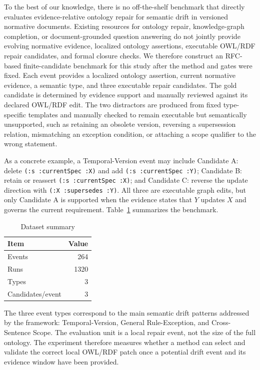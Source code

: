 \documentclass[conference]{IEEEtran}
\begin{document}
To the best of our knowledge, there is no off-the-shelf benchmark that directly evaluates evidence-relative ontology repair for semantic drift in versioned normative documents. Existing resources for ontology repair, knowledge-graph completion, or document-grounded question answering do not jointly provide evolving normative evidence, localized ontology assertions, executable OWL/RDF repair candidates, and formal closure checks. We therefore construct an RFC-based finite-candidate benchmark for this study after the method and gates were fixed. Each event provides a localized ontology assertion, current normative evidence, a semantic type, and three executable repair candidates. The gold candidate is determined by evidence support and manually reviewed against its declared OWL/RDF edit. The two distractors are produced from fixed type-specific templates and manually checked to remain executable but semantically unsupported, such as retaining an obsolete version, reversing a supersession relation, mismatching an exception condition, or attaching a scope qualifier to the wrong statement.

As a concrete example, a Temporal-Version event may include Candidate A: delete \texttt{(:s :currentSpec :X)} and add \texttt{(:s :currentSpec :Y)}; Candidate B: retain or reassert \texttt{(:s :currentSpec :X)}; and Candidate C: reverse the update direction with \texttt{(:X :supersedes :Y)}. All three are executable graph edits, but only Candidate A is supported when the evidence states that $Y$ updates $X$ and governs the current requirement. Table~\ref{tab:dataset} summarizes the benchmark.

\begin{table}[t]
\centering
\caption{Dataset summary}
\label{tab:dataset}
\begin{tabular}{lr}
\toprule
Item & Value \\
\midrule
Events & 264 \\
Runs & 1320 \\
Types & 3 \\
Candidates/event & 3 \\
\bottomrule
\end{tabular}
\end{table}

The three event types correspond to the main semantic drift patterns addressed by the framework: Temporal-Version, General Rule-Exception, and Cross-Sentence Scope. The evaluation unit is a local repair event, not the size of the full ontology. The experiment therefore measures whether a method can select and validate the correct local OWL/RDF patch once a potential drift event and its evidence window have been provided.
\end{document}
